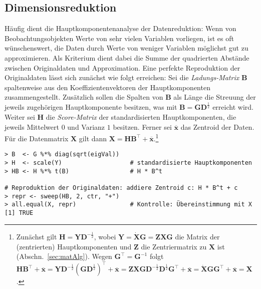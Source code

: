 \subsection{Dimensionsreduktion}

Häufig dient die Hauptkomponentenanalyse der Datenreduktion: Wenn von Beobachtungsobjekten Werte von sehr vielen Variablen vorliegen, ist es oft wünschenswert, die Daten durch Werte von weniger Variablen möglichst gut zu approximieren. Als Kriterium dient dabei die Summe der quadrierten Abstände zwischen Originaldaten und Approximation. Eine perfekte Reproduktion der Originaldaten lässt sich zunächst wie folgt erreichen: Sei die \emph{Ladungs-Matrix} $\bm{B}$ spaltenweise aus den Koeffizientenvektoren der Hauptkomponenten zusammengestellt. Zusätzlich sollen die Spalten von $\bm{B}$ als Länge die Streuung der jeweils zugehörigen Hauptkomponente besitzen, was mit $\bm{B} = \bm{G} \bm{D}^{\frac{1}{2}}$ erreicht wird. Weiter sei $\bm{H}$ die \emph{Score-Matrix} der standardisierten Hauptkomponenten, die jeweils Mittelwert $0$ und Varianz $1$ besitzen. Ferner sei $\overline{\bm{x}}$ das Zentroid der Daten. Für die Datenmatrix $\bm{X}$ gilt dann $\bm{X} = \bm{H} \bm{B}^{\top} + \overline{\bm{x}}$.\footnote{Zunächst gilt $\bm{H} = \bm{Y} \bm{D}^{-\frac{1}{2}}$, wobei $\bm{Y} = \dot{\bm{X}} \bm{G} = \bm{Z} \bm{X} \bm{G}$ die Matrix der (zentrierten) Hauptkomponenten und $\bm{Z}$ die Zentriermatrix zu $\bm{X}$ ist (Abschn.\ \ref{sec:matAlg}). Wegen $\bm{G}^{\top} = \bm{G}^{-1}$ folgt $\bm{H} \bm{B}^{\top} + \overline{\bm{x}} = \bm{Y} \bm{D}^{-\frac{1}{2}} (\bm{G} \bm{D}^{\frac{1}{2}})^{\top} + \overline{\bm{x}} = \bm{Z} \bm{X} \bm{G} \bm{D}^{-\frac{1}{2}} \bm{D}^{\frac{1}{2}} \bm{G}^{\top} + \overline{\bm{x}} = \dot{\bm{X}} \bm{G} \bm{G}^{\top} + \overline{\bm{x}} = \bm{X}$.}
\begin{lstlisting}
> B  <- G %*% diag(sqrt(eigVal))
> H  <- scale(Y)                   # standardisierte Hauptkomponenten
> HB <- H %*% t(B)                 # H * B^t

# Reproduktion der Originaldaten: addiere Zentroid c: H * B^t + c
> repr <- sweep(HB, 2, ctr, "+")
> all.equal(X, repr)               # Kontrolle: Übereinstimmung mit X
[1] TRUE
\end{lstlisting}

